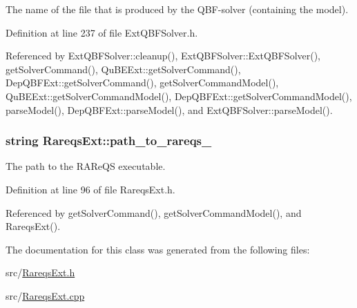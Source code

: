 The name of the file that is produced by the Q\-B\-F-\/solver (containing the model). 



Definition at line 237 of file Ext\-Q\-B\-F\-Solver.\-h.



Referenced by Ext\-Q\-B\-F\-Solver\-::cleanup(), Ext\-Q\-B\-F\-Solver\-::\-Ext\-Q\-B\-F\-Solver(), get\-Solver\-Command(), Qu\-B\-E\-Ext\-::get\-Solver\-Command(), Dep\-Q\-B\-F\-Ext\-::get\-Solver\-Command(), get\-Solver\-Command\-Model(), Qu\-B\-E\-Ext\-::get\-Solver\-Command\-Model(), Dep\-Q\-B\-F\-Ext\-::get\-Solver\-Command\-Model(), parse\-Model(), Dep\-Q\-B\-F\-Ext\-::parse\-Model(), and Ext\-Q\-B\-F\-Solver\-::parse\-Model().

\hypertarget{classRareqsExt_aef57627c91c546f99fbbf0c13c4bd825}{
\subsubsection[{path\-\_\-to\-\_\-rareqs\-\_\-}]{\setlength{\rightskip}{0pt plus 5cm}string Rareqs\-Ext\-::path\-\_\-to\-\_\-rareqs\-\_\-\hspace{0.3cm}{\ttfamily [protected]}}}\label{classRareqsExt_aef57627c91c546f99fbbf0c13c4bd825}


The path to the R\-A\-Re\-Q\-S executable. 



Definition at line 96 of file Rareqs\-Ext.\-h.



Referenced by get\-Solver\-Command(), get\-Solver\-Command\-Model(), and Rareqs\-Ext().



The documentation for this class was generated from the following files\-:\begin{DoxyCompactItemize}
\item 
src/\hyperlink{RareqsExt_8h}{Rareqs\-Ext.\-h}\item 
src/\hyperlink{RareqsExt_8cpp}{Rareqs\-Ext.\-cpp}\end{DoxyCompactItemize}
